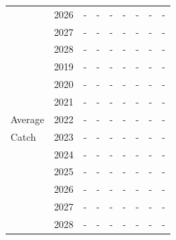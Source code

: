 \documentclass[12pt,]{article}
\begin{document}
\begin{table}[ht]
{\begin{tabular}{l|cc|>{\centering}p{.7in}c|>{\centering}p{.7in}c|>{\centering}p{.7in}c}
   & 2026 & - & - & - & - & - & - & - \\ 
   & 2027 & - & - & - & - & - & - & - \\ 
   & 2028 & - & - & - & - & - & - & - \\ 
   \hline
 & 2019 & - & - & - & - & - & - & - \\ 
   & 2020 & - & - & - & - & - & - & - \\ 
   & 2021 & - & - & - & - & - & - & - \\ 
  Average & 2022 & - & - & - & - & - & - & - \\ 
  Catch & 2023 & - & - & - & - & - & - & - \\ 
   & 2024 & - & - & - & - & - & - & - \\ 
   & 2025 & - & - & - & - & - & - & - \\ 
   & 2026 & - & - & - & - & - & - & - \\ 
   & 2027 & - & - & - & - & - & - & - \\ 
   & 2028 & - & - & - & - & - & - & - \\ 
   \hline
\end{tabular}
}
\end{table}
\end{document}
